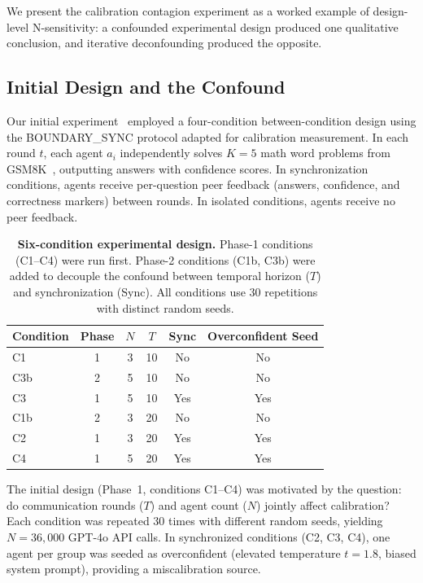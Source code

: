 \documentclass[11pt]{article}
\begin{document}
We present the calibration contagion experiment as a worked example of design-level N-sensitivity: a confounded experimental design produced one qualitative conclusion, and iterative deconfounding produced the opposite.

\subsection{Initial Design and the Confound}

Our initial experiment~\cite{liu2026calibrationcontagion} employed a four-condition between-condition design using the BOUNDARY\_SYNC protocol adapted for calibration measurement. In each round $t$, each agent $a_i$ independently solves $K{=}5$ math word problems from GSM8K~\cite{cobbe2021gsm8k}, outputting answers with confidence scores. In synchronization conditions, agents receive per-question peer feedback (answers, confidence, and correctness markers) between rounds. In isolated conditions, agents receive no peer feedback.

\begin{table}[t]
\centering
\caption{\textbf{Six-condition experimental design.} Phase-1 conditions (C1--C4) were run first. Phase-2 conditions (C1b, C3b) were added to decouple the confound between temporal horizon ($T$) and synchronization (Sync). All conditions use 30 repetitions with distinct random seeds.}
\label{tab:design}
\begin{tabular}{lccccc}
\toprule
Condition & Phase & $N$ & $T$ & Sync & Overconfident Seed \\
\midrule
C1  & 1 & 3 & 10 & No  & No  \\
C3b & 2 & 5 & 10 & No  & No  \\
C3  & 1 & 5 & 10 & Yes & Yes \\
\midrule
C1b & 2 & 3 & 20 & No  & No  \\
C2  & 1 & 3 & 20 & Yes & Yes \\
C4  & 1 & 5 & 20 & Yes & Yes \\
\bottomrule
\end{tabular}
\end{table}

The initial design (Phase~1, conditions C1--C4) was motivated by the question: do communication rounds ($T$) and agent count ($N$) jointly affect calibration? Each condition was repeated 30 times with different random seeds, yielding $N = 36{,}000$ GPT-4o API calls. In synchronized conditions (C2, C3, C4), one agent per group was seeded as overconfident (elevated temperature $t{=}1.8$, biased system prompt), providing a miscalibration source.
\end{document}
